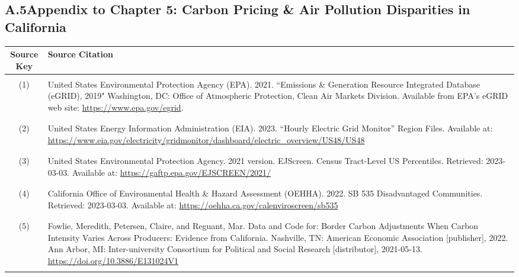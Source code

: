 \subsection*{A.5\quad Appendix to Chapter 5: Carbon Pricing \& Air Pollution Disparities in California}

\begin{center}
    \singlespacing
    \renewcommand{\arraystretch}{1.5}
    \small
    \begin{longtable}{c L{0.8\textwidth}}
        \hline\hline
        Source Key & Source Citation\\
        \hline \\[-3ex]
        (1) & United States Environmental Protection Agency (EPA). 2021. ``Emissions \& Generation Resource Integrated Database (eGRID), 2019" Washington, DC: Office of Atmospheric Protection, Clean Air Markets Division. Available from EPA's eGRID web site: \url{https://www.epa.gov/egrid}.\\ \\[-3ex]
        \hline \\[-3ex]
        (2) & United States Energy Information Administration (EIA). 2023. ``Hourly Electric Grid Monitor'' Region Files. Available at: \url{https://www.eia.gov/electricity/gridmonitor/dashboard/electric_overview/US48/US48}\\ \\[-3ex]
        \hline \\[-3ex]
        (3) & United States Environmental Protection Agency. 2021 version. EJScreen. Census Tract-Level US Percentiles. Retrieved: 2023-03-03. Available at: \url{https://gaftp.epa.gov/EJSCREEN/2021/} \\ \\[-3ex]
        \hline \\[-3ex]
        (4) & California Office of Environmental Health \& Hazard Assessment (OEHHA). 2022. SB 535 Disadvantaged Communities. Retrieved: 2023-03-03. Available at: \url{https://oehha.ca.gov/calenviroscreen/sb535} \\ \\[-3ex]
        \hline \\[-3ex]
        (5) & Fowlie, Meredith, Petersen, Claire, and Reguant, Mar. Data and Code for: Border Carbon Adjustments When Carbon Intensity Varies Across Producers: Evidence from California. Nashville, TN: American Economic Association [publisher], 2022. Ann Arbor, MI: Inter-university Consortium for Political and Social Research [distributor], 2021-05-13. \url{https://doi.org/10.3886/E131024V1} \\ \\[-3ex]

\end{longtable}
\end{center}
